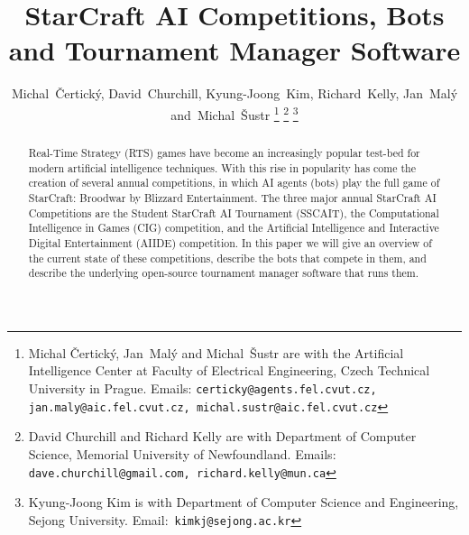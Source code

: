 \documentclass[journal]{IEEEtran}
\begin{document}
\title{StarCraft AI Competitions, Bots\\ and Tournament Manager Software}

\author{Michal~\v{C}ertick\'{y}, David~Churchill, Kyung-Joong~Kim, Richard~Kelly, Jan~Mal\'{y} and~Michal~\v{S}ustr%
\thanks{Michal \v{C}ertick\'{y}, Jan~Mal\'{y} and Michal~\v{S}ustr are with the Artificial Intelligence Center at Faculty of Electrical Engineering, Czech Technical University in Prague. Emails: {\scriptsize \tt{certicky@agents.fel.cvut.cz}, \tt{jan.maly@aic.fel.cvut.cz}, \tt{michal.sustr@aic.fel.cvut.cz}}}%
\thanks{David Churchill and Richard Kelly are with Department of Computer Science, Memorial University of Newfoundland. Emails: {\scriptsize\tt{dave.churchill@gmail.com}, \tt{richard.kelly@mun.ca}}}%
\thanks{Kyung-Joong Kim is with Department of Computer Science and Engineering, Sejong University. Email:~\tt{\scriptsize kimkj@sejong.ac.kr}}%
}

% 


\maketitle
\begin{abstract}
Real-Time Strategy (RTS) games have become an increasingly popular test-bed for modern artificial intelligence techniques. With this rise in popularity has come the creation of several annual competitions, in which AI agents (bots) play the full game of StarCraft: Broodwar by Blizzard Entertainment. The three major annual StarCraft AI Competitions are the Student StarCraft AI Tournament (SSCAIT), the Computational Intelligence in Games (CIG) competition, and the Artificial Intelligence and Interactive Digital Entertainment (AIIDE) competition. In this paper we will give an overview of the current state of these competitions, describe the bots that compete in them, and describe the underlying open-source tournament manager software that runs them. 
\end{abstract}
\end{document}
